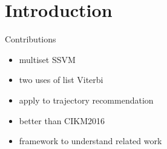 \section{Introduction}
\label{sec:intro}

Contributions
\begin{itemize}
  \item multiset SSVM
  \item two uses of list Viterbi
  \item apply to trajectory recommendation
  \item better than CIKM2016
  \item framework to understand related work
\end{itemize}

